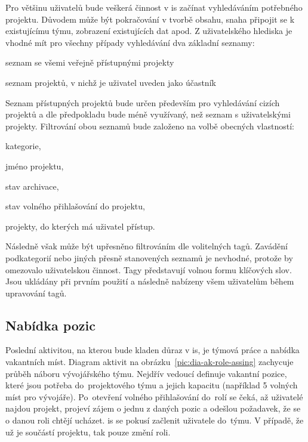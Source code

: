 Pro většinu uživatelů bude veškerá činnost v \gls{is} začínat vyhledáváním potřebného projektu. Důvodem může být pokračování v tvorbě obsahu, snaha připojit se k existujícímu týmu, zobrazení existujících dat apod. Z uživatelského hlediska je vhodné mít pro všechny případy vyhledávání dva základní seznamy:

\begin{ulnar}
   \item seznam se všemi veřejně přístupnými projekty
   \item seznam projektů, v nichž je uživatel uveden jako účastník
\end{ulnar}

Seznam přístupných projektů bude určen především pro vyhledávání cizích projektů a dle předpokladu bude méně využívaný, než seznam s uživatelskými projekty. Filtrování obou seznamů bude založeno na volbě obecných vlastností:

\begin{ulnar}
   \item kategorie,
   \item jméno projektu,
   \item stav archivace,
   \item stav volného přihlašování do projektu,
   \item projekty, do kterých má uživatel přístup.
\end{ulnar}

Následně však může být upřesněno filtrováním dle volitelných tagů. Zavádění podkategorií nebo jiných přesně stanovených seznamů je nevhodné, protože by omezovalo uživatelskou činnost. Tagy představují volnou formu klíčových slov. Jsou ukládány při prvním použití a následně nabízeny všem uživatelům během upravování tagů.





\subsection{Nabídka pozic}

Poslední aktivitou, na kterou bude kladen důraz v \gls{is}, je týmová práce a nabídka vakantních míst. Diagram aktivit na obrázku~\ref{pic:dia-ak-role-assing} zachycuje průběh náboru vývojářského týmu. Nejdřív vedoucí definuje vakantní pozice, které jsou potřeba do~projektového týmu a jejich kapacitu (například 5 volných míst pro vývojáře). Po~otevření volného přihlašování do~rolí se čeká, až uživatelé najdou projekt, projeví zájem o jednu z daných pozic a odešlou požadavek, že se o danou roli chtějí ucházet. \gls{is} se pokusí začlenit uživatele do~týmu. V případě, že už je součástí projektu, tak pouze změní roli.


